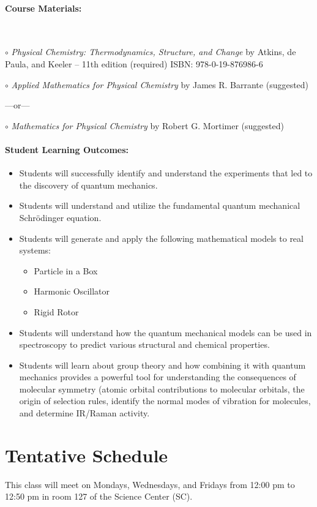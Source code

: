 \documentclass[12pt, letterpaper]{article}
\begin{document}
\paragraph{Course Materials:} ~

$\circ$ \emph{Physical Chemistry: Thermodynamics, Structure, and Change} by Atkins, de Paula, and Keeler -- 11th edition (required) ISBN: 978-0-19-876986-6

$\circ$ \emph{Applied Mathematics for Physical Chemistry} by James R. Barrante (suggested)

\vspace{-4pt}
---or---

\vspace{-4pt}
$\circ$ \emph{Mathematics for Physical Chemistry} by Robert G. Mortimer (suggested)

\paragraph{Student Learning Outcomes:}
\begin{itemize}
	\item{Students will successfully identify and understand the experiments that led to the discovery of quantum mechanics.}
	\item{Students will understand and utilize the fundamental quantum mechanical Schrödinger equation.}
	\item{Students will generate and apply the following mathematical models to real systems:}
	\begin{itemize}
		\item{Particle in a Box}
		\item{Harmonic Oscillator}
		\item{Rigid Rotor}
	\end{itemize}
	\item{Students will understand how the quantum mechanical models can be used in spectroscopy to predict various structural and chemical properties.}
	\item{Students will learn about group theory and how combining it with quantum mechanics provides a powerful tool for understanding the consequences of molecular symmetry (atomic orbital contributions to molecular orbitals, the origin of selection rules, identify the normal modes of vibration for molecules, and determine IR/Raman activity.}
\end{itemize}

\section*{Tentative Schedule}
This class will meet on Mondays, Wednesdays, and Fridays from 12:00 pm to 12:50 pm in room 127 of the Science Center (SC).
\end{document}
